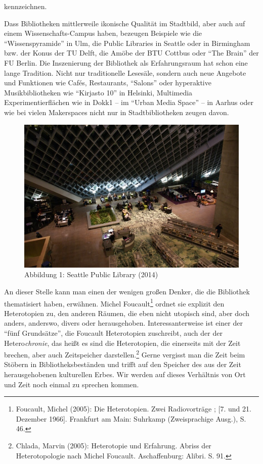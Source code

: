 kennzeichnen.

Dass Bibliotheken mittlerweile ikonische Qualität im Stadtbild, aber
auch auf einem Wissenschafts-Campus haben, bezeugen Beispiele wie die
\enquote{Wissenspyramide} in Ulm, die Public Libraries in Seattle oder
in Birmingham bzw. der Konus der TU Delft, die Amöbe der BTU Cottbus
oder \enquote{The Brain} der FU Berlin. Die Inszenierung der Bibliothek
als Erfahrungsraum hat schon eine lange Tradition. Nicht nur
traditionelle Lesesäle, sondern auch neue Angebote und Funktionen wie
Cafés, Restaurants, \enquote{Salons} oder hyperaktive Musikbibliotheken
wie \enquote{Kirjasto 10} in Helsinki, Multimedia Experimentierflächen
wie in Dokk1 -- im \enquote{Urban Media Space} -- in Aarhus oder wie bei
vielen Makerspaces nicht nur in Stadtbibliotheken zeugen davon.

\begin{figure}[htbp]
\centering
\includegraphics{img/hobohm-1.jpg}
\caption{Abbildung 1: Seattle Public Library (2014)}
\end{figure}

An dieser Stelle kann man einen der wenigen großen Denker, die die
Bibliothek thematisiert haben, erwähnen. Michel Foucault\footnote{Foucault,
  Michel (2005): Die Heterotopien. Zwei Radiovorträge ; {[}7. und 21.
  Dezember 1966{]}. Frankfurt am Main: Suhrkamp (Zweisprachige Ausg.),
  S. 46.} ordnet sie explizit den Heterotopien zu, den anderen Räumen,
die eben nicht utopisch sind, aber doch anders, anderswo, divers oder
herausgehoben. Interessanterweise ist einer der \enquote{fünf
Grundsätze}, die Foucault Heterotopien zuschreibt, auch der der
Hetero\emph{chronie}, das heißt es sind die Heterotopien, die einerseits
mit der Zeit brechen, aber auch Zeitspeicher darstellen.\footnote{Chlada,
  Marvin (2005): Heterotopie und Erfahrung. Abriss der Heterotopologie
  nach Michel Foucault. Aschaffenburg: Alibri. S. 91.} Gerne vergisst
man die Zeit beim Stöbern in Bibliotheksbeständen und trifft auf den
Speicher des aus der Zeit herausgehobenen kulturellen Erbes. Wir werden
auf dieses Verhältnis von Ort und Zeit noch einmal zu sprechen kommen.


